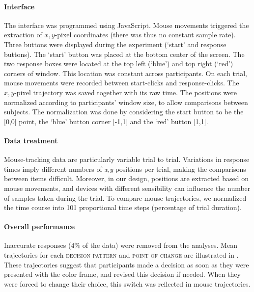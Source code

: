 \documentclass{article}
\begin{document}
\paragraph{Interface}
The interface was programmed using JavaScript. Mouse movements triggered the extraction of $x,y$-pixel coordinates (there was thus no constant sample rate).
Three buttons were displayed during the experiment (`start' and response buttons). The `start' button was placed at the bottom center of the screen. The two response boxes were located at the top left (`blue') and top right (`red') corners of window. This location was constant across participants.  
On each trial, mouse movements were recorded between start-clicks and response-clicks. The $x,y$-pixel trajectory was saved together with its raw time. The positions were normalized according to participants' window size, to allow comparisons between subjects. The normalization was done by considering the start button to be the [0,0] point, the `blue' button corner  [-1,1] and the `red' button  [1,1]. 

\paragraph{Data treatment}
Mouse-tracking data are particularly variable trial to trial. Variations in response times imply different numbers of \textit{x,y} positions per trial, making the comparisons between items difficult. Moreover, in our design, positions are extracted based on mouse movements, and devices with different sensibility can influence the number of samples taken during the trial. To compare mouse trajectories, we normalized the time course into 101 proportional time steps (percentage of trial duration). 

\paragraph{Overall performance}
Inaccurate responses (4\% of the data) were removed from the analyses. 
Mean trajectories for each \textsc{decision pattern} and \textsc{point of change} are illustrated in . 
These trajectories suggest that participants made a decision as soon as they were presented with the color frame, and revised this decision if needed. When they were forced to change their choice, this switch was reflected in mouse trajectories. 
\end{document}
